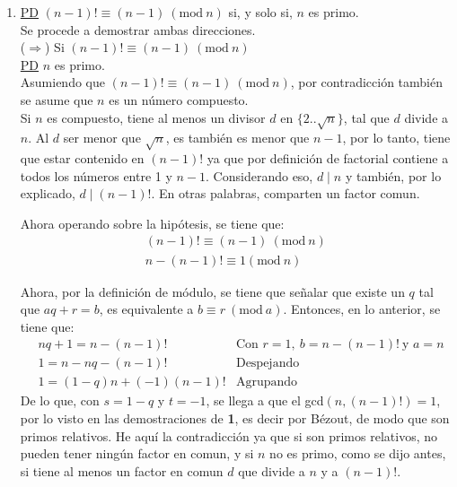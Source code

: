 \documentclass[letter]{article}
\begin{document}
\begin{pregunta}{2}
\begin{enumerate}
		\item \underline{PD} $(n-1)!\equiv (n-1)\ (\text{mod} \ n)$ si, y solo si, $n$ es primo.\\
		Se procede a demostrar ambas direcciones.\\
		($\Rightarrow$) Si $(n-1)!\equiv (n-1)\ (\text{mod} \ n)$\\
		\underline{PD} $n$ es primo.\\
		Asumiendo que $(n-1)!\equiv (n-1)\ (\text{mod} \ n)$, por contradicción también se asume que $n$ es un número compuesto.\\
		Si $n$ es compuesto, tiene al menos un divisor $d$ en $\{2..\sqrt{n}\}$, tal que $d$ divide a $n$. Al $d$ ser menor que $\sqrt{n}$, es también es menor que $n-1$, por lo tanto, tiene que estar contenido en $(n-1)!$ ya que por definición de factorial contiene a todos los números entre 1 y $n-1$. Considerando eso, $d\mid n$ y también, por lo explicado, $d\mid (n-1)!$. En otras palabras, comparten un factor comun.
		
		Ahora operando sobre la hipótesis, se tiene que:
		\begin{align*}
			(n-1)!\equiv (n-1)\ (\text{mod} \ n)\\
			n - (n-1)!\equiv 1 (\text{mod} \ n)
		\end{align*}
		
		Ahora, por la definición de módulo, se tiene que señalar que existe un $q$ tal que $aq+r=b$, es equivalente a $b \equiv r \ (\text{mod} \ a)$. Entonces, en lo anterior, se tiene que:
		\begin{align*}
			& nq + 1 = n - (n-1)! & \text{Con } r=1, \ b=n - (n-1)! \ \text{y } a=n\\
			& 1 = n - nq - (n-1)! & \text{Despejando}\\
			& 1 = (1-q)n + (-1)(n-1)! & \text{Agrupando}
		\end{align*}
		De lo que, con $s=1-q$ y $t=-1$, se llega a que el gcd$(n, (n-1)!)=1$, por lo visto en las demostraciones de \textbf{1}, es decir por Bézout, de modo que son primos relativos. He aquí la contradicción ya que si son primos relativos, no pueden tener ningún factor en comun, y si $n$ no es primo, como se dijo antes, si tiene al menos un factor en comun $d$ que divide a $n$ y a $(n-1)!$.\\
		

\end{enumerate}
\end{pregunta}
\end{document}

